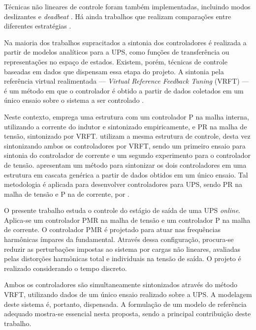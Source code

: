 \documentclass[repeatfields,oneside]{tcc}
\begin{document}
Técnicas não lineares de controle foram também implementadas, incluindo modos deslizantes \cite{Utkin1993, Jung1996} e \textit{deadbeat} \cite{Park2003}.
Há ainda trabalhos que realizam comparações entre diferentes estratégias \cite{Timbus2009}.

Na maioria dos trabalhos supracitados a sintonia dos controladores é realizada a partir de modelos analíticos para a UPS, como funções de transferência ou representações no espaço de estados.
Existem, porém, técnicas de controle baseadas em dados que dispensam essa etapa do projeto.
A sintonia pela referência virtual realimentada --- \textit{Virtual Reference Feedback Tuning} (VRFT) --- é um método em que o controlador é obtido a partir de dados coletados em um único ensaio sobre o sistema a ser controlado \cite{Campi2000}.

Neste contexto, \textcite{Schildt2014} emprega uma estrutura com um controlador P na malha interna, utilizando a corrente do indutor e sintonizado empiricamente, e PR na malha de tensão, sintonizado por VRFT.
\textcite{Corleta2015, Corleta2016} utilizam a mesma estrutura de controle, desta vez sintonizando ambos os controladores por VRFT, sendo um primeiro ensaio para sintonia do controlador de corrente e um segundo experimento para o controlador de tensão.
%
\textcite{Chrystian2020} apresentam um método para sintonizar os dois controladores em uma estrutura em cascata genérica a partir de dados obtidos em um único ensaio.
Tal metodologia é aplicada para desenvolver controladores para UPS, sendo PR na malha de tensão e P na de corrente, por \textcite{Bruna2020}.

O presente trabalho estuda o controle do estágio de saída de uma UPS \textit{online}.
Aplica-se um controlador PMR na malha de tensão e um controlador P na malha de corrente.
O controlador PMR é projetado para atuar nas frequências harmônicas ímpares da fundamental.
Através dessa configuração, procura-se reduzir as perturbações impostas ao sistema por cargas não lineares, avaliadas pelas distorções harmônicas total e individuais na tensão de saída.
O projeto é realizado considerando o tempo discreto.

\newpage
Ambos os controladores são simultaneamente sintonizados através do método VRFT, utilizando dados de um único ensaio realizado sobre a UPS.
A modelagem deste sistema é, portanto, dispensada.
A formulação de um modelo de referência adequado mostra-se essencial nesta proposta, sendo a principal contribuição deste trabalho.
\end{document}
